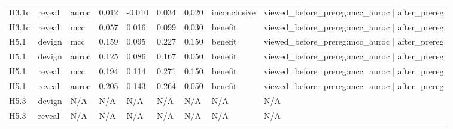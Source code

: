 \begin{tabular}{lllllllll}
H3.1c & reveal & auroc & 0.012 & -0.010 & 0.034 & 0.020 & inconclusive & viewed\_before\_prereg:mcc\_auroc | after\_prereg \\
H3.1c & reveal & mcc & 0.057 & 0.016 & 0.099 & 0.030 & benefit & viewed\_before\_prereg:mcc\_auroc | after\_prereg \\
H5.1 & devign & mcc & 0.159 & 0.095 & 0.227 & 0.150 & benefit & viewed\_before\_prereg:mcc\_auroc | after\_prereg \\
H5.1 & devign & auroc & 0.125 & 0.086 & 0.167 & 0.050 & benefit & viewed\_before\_prereg:mcc\_auroc | after\_prereg \\
H5.1 & reveal & mcc & 0.194 & 0.114 & 0.271 & 0.150 & benefit & viewed\_before\_prereg:mcc\_auroc | after\_prereg \\
H5.1 & reveal & auroc & 0.205 & 0.143 & 0.264 & 0.050 & benefit & viewed\_before\_prereg:mcc\_auroc | after\_prereg \\
H5.3 & devign & N/A & N/A & N/A & N/A & N/A & N/A & N/A \\
H5.3 & reveal & N/A & N/A & N/A & N/A & N/A & N/A & N/A \\
\bottomrule
\end{tabular}